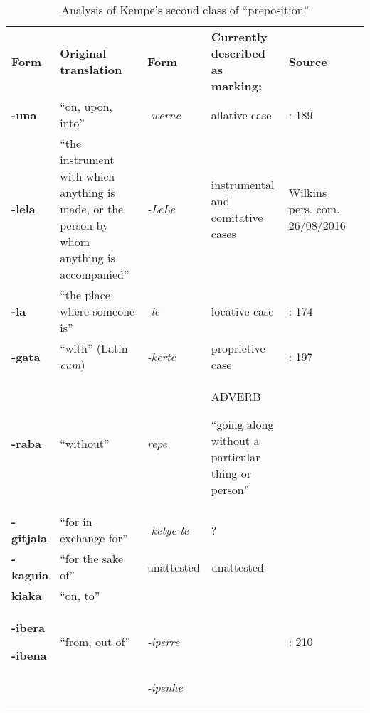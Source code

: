 \begin{sidewaystable}
\begin{tabularx}{\textwidth}{lQlQp{3cm}l}
 \textbf{Form}
 & \textbf{Original translation}
 & \textbf{Form}
 & \textbf{Currently described as marking:}  & \textbf{Source}
 & \\

\lsptoprule
\textbf{{}-una}
 & “on, upon, into” & \textit{{}-werne}
 & allative case & \citet{wilkins_mparntwe_1989}: 189 & \\
\textbf{{}-lela}
 & “the instrument with which anything is made, or the person by whom anything is accompanied” & \textit{{}-LeLe}
 & instrumental and comitative cases & Wilkins pers. com. 26/08/2016 & \\
\textbf{{}-la}
 & “the place where someone is” & \textit{{}-le}
 & locative case & \citet{wilkins_mparntwe_1989}: 174 & \\
\textbf{{}-gata}
 & “with” (Latin \textit{cum}) & \textit{{}-kerte}
 & proprietive case & \citet{wilkins_mparntwe_1989}: 197 & \\
\textbf{{}-raba}
 & ``without” & \textit{repe}
 & ADVERB

“going along without a particular thing or person” & \citet{henderson_eastern_1994}
 & \\
\textbf{{}-gitjala}
 & “for in exchange for” & \textit{{}-ketye-le}
 & ? &  & \\
\textbf{{}-kaguia}
 & “for the sake of” &{ unattested} & unattested
 &  & \\
\textbf{kiaka}
 & “on, to” &  &  &  & \\
\textbf{{}-ibera}

\textbf{{}-ibena}
 & “from, out of” & \textit{{}-iperre}
 &  & \citet{wilkins_mparntwe_1989}: 210 & \\
 &  & \textit{{}-ipenhe}
 &  &  & \\
\\
\lspbottomrule
\end{tabularx}
\caption{Analysis of Kempe’s second class of “preposition''}
\label{bkm:Ref456020961}\label{tab:key:9-190}
\end{sidewaystable}

